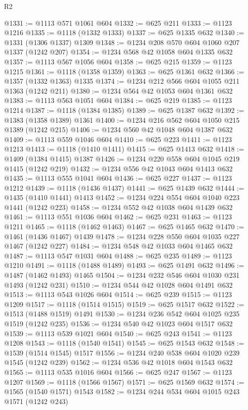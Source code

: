\begin{lexlean}{R2}
\begin{coremodule}
@1331 := @1113 @571 @1061 @604
@1332 := @625 @211
@1333 := @1123 @1216
@1335 := @1118 (@1332 @1333)
@1337 := @625 @1335 @632
@1340 := @1331 (@1306 @1337) @1309
@1348 := @1234 @208 @570 @604 @1060 @207 @1337 (@1242 @207)
@1354 := @1234 @568 @42 @1058 @604 @1335 @632
@1357 := @1113 @567 @1056 @604
@1358 := @625 @215
@1359 := @1123 @1215
@1361 := @1118 (@1358 @1359)
@1363 := @625 @1361 @632
@1366 := @1357 (@1332 @1363) @1335
@1374 := @1234 @212 @566 @604 @1055 @211 @1363 (@1242 @211)
@1380 := @1234 @564 @42 @1053 @604 @1361 @632
@1383 := @1113 @563 @1051 @604
@1384 := @625 @219
@1385 := @1123 @1214
@1387 := @1118 (@1384 @1385)
@1389 := @625 @1387 @632
@1392 := @1383 (@1358 @1389) @1361
@1400 := @1234 @216 @562 @604 @1050 @215 @1389 (@1242 @215)
@1406 := @1234 @560 @42 @1048 @604 @1387 @632
@1409 := @1113 @559 @1046 @604
@1410 := @625 @223
@1411 := @1123 @1213
@1413 := @1118 (@1410 @1411)
@1415 := @625 @1413 @632
@1418 := @1409 (@1384 @1415) @1387
@1426 := @1234 @220 @558 @604 @1045 @219 @1415 (@1242 @219)
@1432 := @1234 @556 @42 @1043 @604 @1413 @632
@1435 := @1113 @555 @1041 @604
@1436 := @625 @227
@1437 := @1123 @1212
@1439 := @1118 (@1436 @1437)
@1441 := @625 @1439 @632
@1444 := @1435 (@1410 @1441) @1413
@1452 := @1234 @224 @554 @604 @1040 @223 @1441 (@1242 @223)
@1458 := @1234 @552 @42 @1038 @604 @1439 @632
@1461 := @1113 @551 @1036 @604
@1462 := @625 @231
@1463 := @1123 @1211
@1465 := @1118 (@1462 @1463)
@1467 := @625 @1465 @632
@1470 := @1461 (@1436 @1467) @1439
@1478 := @1234 @228 @550 @604 @1035 @227 @1467 (@1242 @227)
@1484 := @1234 @548 @42 @1033 @604 @1465 @632
@1487 := @1113 @547 @1031 @604
@1488 := @625 @235
@1489 := @1123 @1210
@1491 := @1118 (@1488 @1489)
@1493 := @625 @1491 @632
@1496 := @1487 (@1462 @1493) @1465
@1504 := @1234 @232 @546 @604 @1030 @231 @1493 (@1242 @231)
@1510 := @1234 @544 @42 @1028 @604 @1491 @632
@1513 := @1113 @543 @1026 @604
@1514 := @625 @239
@1515 := @1123 @1209
@1517 := @1118 (@1514 @1515)
@1519 := @625 @1517 @632
@1522 := @1513 (@1488 @1519) @1491
@1530 := @1234 @236 @542 @604 @1025 @235 @1519 (@1242 @235)
@1536 := @1234 @540 @42 @1023 @604 @1517 @632
@1539 := @1113 @539 @1021 @604
@1540 := @625 @243
@1541 := @1123 @1208
@1543 := @1118 (@1540 @1541)
@1545 := @625 @1543 @632
@1548 := @1539 (@1514 @1545) @1517
@1556 := @1234 @240 @538 @604 @1020 @239 @1545 (@1242 @239)
@1562 := @1234 @536 @42 @1018 @604 @1543 @632
@1565 := @1113 @535 @1016 @604
@1566 := @625 @247
@1567 := @1123 @1207
@1569 := @1118 (@1566 @1567)
@1571 := @625 @1569 @632
@1574 := @1565 (@1540 @1571) @1543
@1582 := @1234 @244 @534 @604 @1015 @243 @1571 (@1242 @243)

\end{coremodule}
\end{lexlean}
